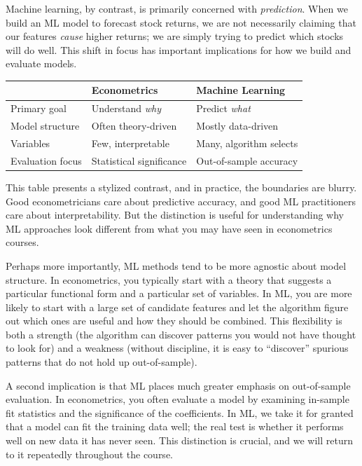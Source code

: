 \documentclass[11pt,a4paper]{article}
\begin{document}
Machine learning, by contrast, is primarily concerned with \emph{prediction}. When we build an ML model to forecast stock returns, we are not necessarily claiming that our features \emph{cause} higher returns; we are simply trying to predict which stocks will do well. This shift in focus has important implications for how we build and evaluate models.

\begin{center}
\begin{tabular}{lll}
\toprule
& \textbf{Econometrics} & \textbf{Machine Learning} \\
\midrule
Primary goal & Understand \emph{why} & Predict \emph{what} \\
Model structure & Often theory-driven & Mostly data-driven \\
Variables & Few, interpretable & Many, algorithm selects \\
Evaluation focus & Statistical significance & Out-of-sample accuracy \\
\bottomrule
\end{tabular}
\end{center}

This table presents a stylized contrast, and in practice, the boundaries are blurry. Good econometricians care about predictive accuracy, and good ML practitioners care about interpretability. But the distinction is useful for understanding why ML approaches look different from what you may have seen in econometrics courses.

Perhaps more importantly, ML methods tend to be more agnostic about model structure. In econometrics, you typically start with a theory that suggests a particular functional form and a particular set of variables. In ML, you are more likely to start with a large set of candidate features and let the algorithm figure out which ones are useful and how they should be combined. This flexibility is both a strength (the algorithm can discover patterns you would not have thought to look for) and a weakness (without discipline, it is easy to ``discover'' spurious patterns that do not hold up out-of-sample).

A second implication is that ML places much greater emphasis on out-of-sample evaluation. In econometrics, you often evaluate a model by examining in-sample fit statistics and the significance of the coefficients. In ML, we take it for granted that a model can fit the training data well; the real test is whether it performs well on new data it has never seen. This distinction is crucial, and we will return to it repeatedly throughout the course.
\end{document}
